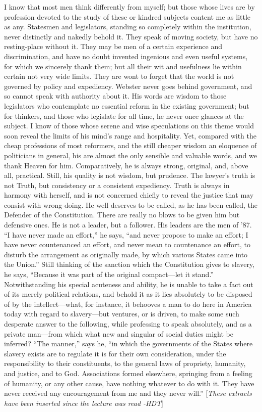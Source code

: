 \documentclass[12pt]{article}
\begin{document}
I know that most men think differently from myself; but those whose
lives are by profession devoted to the study of these or kindred
subjects content me as little as any. Statesmen and legislators,
standing so completely within the institution, never distinctly and
nakedly behold it. They speak of moving society, but have no
resting-place without it. They may be men of a certain experience and
discrimination, and have no doubt invented ingenious and even useful
systems, for which we sincerely thank them; but all their wit and
usefulness lie within certain not very wide limits. They are wont to
forget that the world is not governed by policy and expediency. Webster
never goes behind government, and so cannot speak with authority about
it. His words are wisdom to those legislators who contemplate no
essential reform in the existing government; but for thinkers, and those
who legislate for all time, he never once glances at the subject. I know
of those whose serene and wise speculations on this theme would soon
reveal the limits of his mind's range and hospitality. Yet, compared
with the cheap professions of most reformers, and the still cheaper
wisdom an eloquence of politicians in general, his are almost the only
sensible and valuable words, and we thank Heaven for him. Comparatively,
he is always strong, original, and, above all, practical. Still, his
quality is not wisdom, but prudence. The lawyer's truth is not Truth,
but consistency or a consistent expediency. Truth is always in harmony
with herself, and is not concerned chiefly to reveal the justice that
may consist with wrong-doing. He well deserves to be called, as he has
been called, the Defender of the Constitution. There are really no blows
to be given him but defensive ones. He is not a leader, but a follower.
His leaders are the men of '87. ``I have never made an effort,'' he
says, ``and never propose to make an effort; I have never countenanced
an effort, and never mean to countenance an effort, to disturb the
arrangement as originally made, by which various States came into the
Union.'' Still thinking of the sanction which the Constitution gives to
slavery, he says, ``Because it was part of the original compact---let it
stand.'' Notwithstanding his special acuteness and ability, he is unable
to take a fact out of its merely political relations, and behold it as
it lies absolutely to be disposed of by the intellect---what, for
instance, it behooves a man to do here in America today with regard to
slavery---but ventures, or is driven, to make some such desperate answer
to the following, while professing to speak absolutely, and as a private
man---from which what new and singular of social duties might be
inferred? ``The manner,'' says he, ``in which the governments of the
States where slavery exists are to regulate it is for their own
consideration, under the responsibility to their constituents, to the
general laws of propriety, humanity, and justice, and to God.
Associations formed elsewhere, springing from a feeling of humanity, or
any other cause, have nothing whatever to do with it. They have never
received any encouragement from me and they never will.''  {[}\textit{These
extracts have been inserted since the lecture was read -HDT}]
\end{document}
